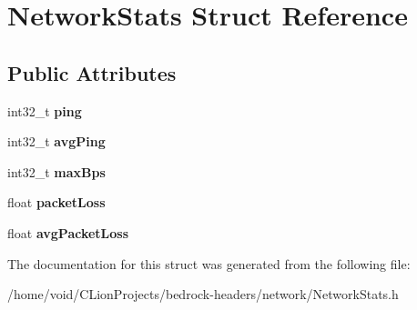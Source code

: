 \hypertarget{struct_network_stats}{}\section{Network\+Stats Struct Reference}
\label{struct_network_stats}
\subsection*{Public Attributes}
\begin{DoxyCompactItemize}
\item 
\mbox{\label{struct_network_stats_a22c7c69a7d4ae2f93d085e5e8b8fbe1b}} 
int32\+\_\+t {\bfseries ping}
\item 
\mbox{\label{struct_network_stats_acd11ee9fa1b8cb8e566e6de3cf84453b}} 
int32\+\_\+t {\bfseries avg\+Ping}
\item 
\mbox{\label{struct_network_stats_a2bee9ad3b913f363732b98c509b5a6b7}} 
int32\+\_\+t {\bfseries max\+Bps}
\item 
\mbox{\label{struct_network_stats_a8b6592fc39c3ca874e5d9fbcae79f7c1}} 
float {\bfseries packet\+Loss}
\item 
\mbox{\label{struct_network_stats_a9441ba1eb8a1133eea3ab573e3e2be30}} 
float {\bfseries avg\+Packet\+Loss}
\end{DoxyCompactItemize}


The documentation for this struct was generated from the following file\+:\begin{DoxyCompactItemize}
\item 
/home/void/\+C\+Lion\+Projects/bedrock-\/headers/network/Network\+Stats.\+h\end{DoxyCompactItemize}
